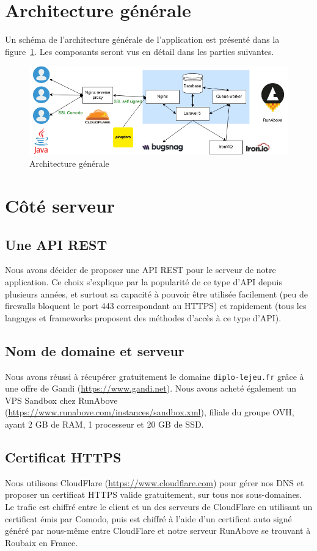 \section{Architecture générale}
	Un schéma de l'architecture générale de l'application est présenté dans la figure~\ref{fig:architecture-generale}. Les composants seront vus en détail dans les parties suivantes.

	\begin{figure}[H]
		\centering
		\includegraphics[width=1\textwidth]{images/architecture.png}
		\caption{Architecture générale}
		\label{fig:architecture-generale}
	\end{figure}

\section{Côté serveur}
	\subsection{Une API REST}
		Nous avons décider de proposer une API REST pour le serveur de notre application. Ce choix s'explique par la popularité de ce type d'API depuis plusieurs années, et surtout sa capacité à pouvoir être utilisée facilement (peu de firewalls bloquent le port 443 correspondant au HTTPS) et rapidement (tous les langages et frameworks proposent des méthodes d'accès à ce type d'API).

	\subsection{Nom de domaine et serveur}
		Nous avons réussi à récupérer gratuitement le domaine \texttt{diplo-lejeu.fr} grâce à une offre de Gandi (\url{https://www.gandi.net}). Nous avons acheté également un VPS Sandbox chez RunAbove (\url{https://www.runabove.com/instances/sandbox.xml}), filiale du groupe OVH, ayant 2 GB de RAM, 1 processeur et 20 GB de SSD.

	\subsection{Certificat HTTPS}
		Nous utilisons CloudFlare (\url{https://www.cloudflare.com}) pour gérer nos DNS et proposer un certificat HTTPS valide gratuitement, sur tous nos sous-domaines. Le trafic est chiffré entre le client et un des serveurs de CloudFlare en utilisant un certificat émis par Comodo, puis est chiffré à l'aide d'un certificat auto signé généré par nous-même entre CloudFlare et notre serveur RunAbove se trouvant à Roubaix en France.\\


